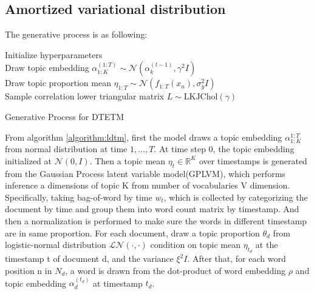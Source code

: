 \subsection{Amortized variational distribution}
The generative process is as following:\\
\begin{algorithm}[H]
Initialize hyperparameters\\
Draw topic embedding $ \alpha_{1:K}^{(1:T)}\sim\mathcal{N}(\alpha_k^{(t-1)},\gamma^2I) $\\
Draw topic proportion mean $ \eta_{1:T}\sim\mathcal{N}(f_{1:T}(x_n),\sigma_y^2I) $\\
Sample correlation lower triangular matrix $ L\sim \text{LKJChol}(\gamma)$\\
\caption{Generative Process for DTETM}
\label{algorithm:ldtm}
\end{algorithm}
From algorithm \ref{algorithm:ldtm}, first the model draws a topic embedding $ \alpha_{1:K}^{1:T} $ from normal distribution at time $ 1,\dots,T $. At time step 0, the topic embedding initialized at $ \mathcal{N}(0,I) $.
Then a topic mean $ \eta_t\in\mathbb{R}^{K} $ over timestamps is generated from the Gaussian Process latent variable model(GPLVM), which performs inference a dimensions of topic K from number of vocabularies V dimension. Specifically, taking bag-of-word by time $ w_t $, which is collected by categorizing the document by time and group them into word count matrix by timestamp. And then a normalization is performed to make sure the words in different timestamp are in same proportion.
For each document, draw a topic proportion $ \theta_{d} $ from logistic-normal distribution $ \mathcal{LN}(\cdot,\cdot) $ condition on topic mean $ \eta_{t_d} $ at the timestamp t of document d, and the variance $ \xi^2I $.
After that, for each word position n in $ N_d $, a word is drawn from the dot-product of word embedding $ \rho $ and topic embedding $ \alpha^{(t_d)}_{d} $ at timestamp $ t_d $. 
